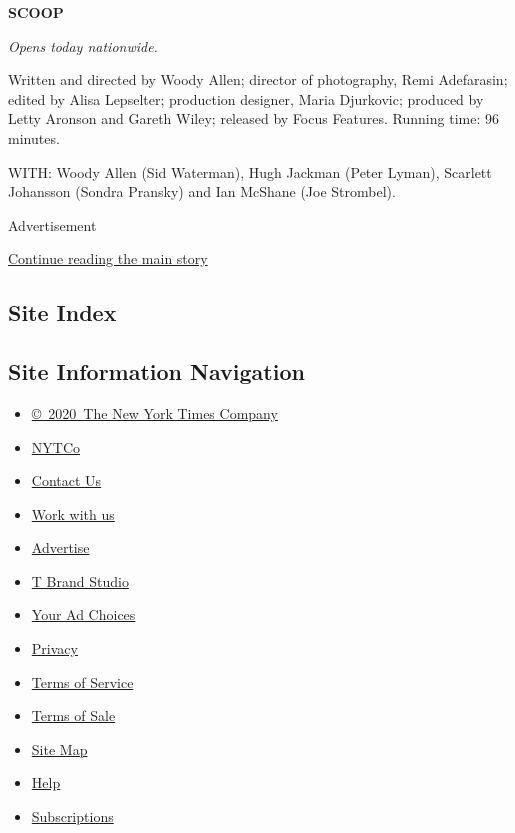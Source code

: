 \textbf{SCOOP}

\emph{Opens today nationwide.}

Written and directed by Woody Allen; director of photography, Remi
Adefarasin; edited by Alisa Lepselter; production designer, Maria
Djurkovic; produced by Letty Aronson and Gareth Wiley; released by Focus
Features. Running time: 96 minutes.

WITH: Woody Allen (Sid Waterman), Hugh Jackman (Peter Lyman), Scarlett
Johansson (Sondra Pransky) and Ian McShane (Joe Strombel).

Advertisement

\protect\hyperlink{after-bottom}{Continue reading the main story}

\hypertarget{site-index}{%
\subsection{Site Index}\label{site-index}}

\hypertarget{site-information-navigation}{%
\subsection{Site Information
Navigation}\label{site-information-navigation}}

\begin{itemize}
\tightlist
\item
  \href{https://help.nytimes3xbfgragh.onion/hc/en-us/articles/115014792127-Copyright-notice}{©~2020~The
  New York Times Company}
\end{itemize}

\begin{itemize}
\tightlist
\item
  \href{https://www.nytco.com/}{NYTCo}
\item
  \href{https://help.nytimes3xbfgragh.onion/hc/en-us/articles/115015385887-Contact-Us}{Contact
  Us}
\item
  \href{https://www.nytco.com/careers/}{Work with us}
\item
  \href{https://nytmediakit.com/}{Advertise}
\item
  \href{http://www.tbrandstudio.com/}{T Brand Studio}
\item
  \href{https://www.nytimes3xbfgragh.onion/privacy/cookie-policy\#how-do-i-manage-trackers}{Your
  Ad Choices}
\item
  \href{https://www.nytimes3xbfgragh.onion/privacy}{Privacy}
\item
  \href{https://help.nytimes3xbfgragh.onion/hc/en-us/articles/115014893428-Terms-of-service}{Terms
  of Service}
\item
  \href{https://help.nytimes3xbfgragh.onion/hc/en-us/articles/115014893968-Terms-of-sale}{Terms
  of Sale}
\item
  \href{https://spiderbites.nytimes3xbfgragh.onion}{Site Map}
\item
  \href{https://help.nytimes3xbfgragh.onion/hc/en-us}{Help}
\item
  \href{https://www.nytimes3xbfgragh.onion/subscription?campaignId=37WXW}{Subscriptions}
\end{itemize}
